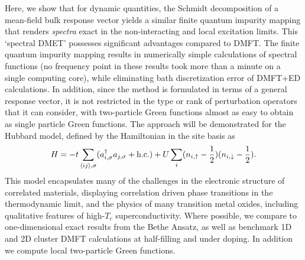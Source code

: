 \documentclass[aps,twocolumn,nobibnotes]{revtex4}
\begin{document}
Here, we show that for dynamic quantities, the Schmidt decomposition of a mean-field bulk response vector yields a similar finite quantum impurity mapping
that renders {\em spectra} exact in the non-interacting and local excitation limits. This `spectral DMET' possesses significant advantages compared to
DMFT. The finite quantum impurity mapping results in numerically simple calculations of spectral functions (no frequency point in these results
took more than a minute on a single computing core), while eliminating bath discretization error of DMFT+ED calculations.
In addition, since the method is formulated in terms of a general response vector, it is not restricted in the type or rank of perturbation 
operators that it can consider, with two-particle Green functions almost as easy to obtain as single particle Green functions. 
The approach will be demonstrated for the Hubbard model, 
defined by the Hamiltonian in the site basis as
\begin{equation}
H = -t \sum_{\langle ij \rangle, \sigma} (a_{i,\sigma}^{\dagger}a_{j,\sigma} + \text{\textnormal {h.c.}}) + U \sum_i (n_{i,\uparrow} - \frac{1}{2})(n_{i,\downarrow} - \frac{1}{2})  . \label{eqn:hub}
\end{equation}
This model encapsulates many of the challenges in the electronic structure of correlated materials, displaying correlation driven 
phase transitions in the thermodynamic limit, and the physics of many transition metal oxides\cite{Limelette2003}, including qualitative features 
of high-$T_c$ superconductivity\cite{Anderson87,Sordi2012,Millis2013}. Where possible, we compare to one-dimensional exact results from the Bethe 
Ansatz\cite{Lieb68,Ovchinni1970}, as well as benchmark 1D and 2D cluster DMFT calculations at half-filling 
and under doping\cite{Go2009,Kotliar2008,Masatoshi2009}. In addition we compute local two-particle Green functions.
\end{document}
